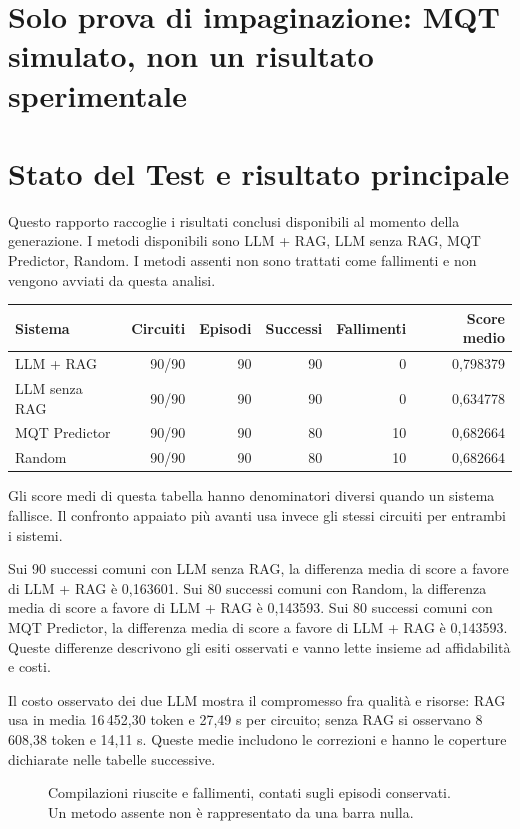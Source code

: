 \providecommand{\TestReportPath}{../}
\section*{Solo prova di impaginazione: MQT simulato, non un risultato sperimentale}
\section{Stato del Test e risultato principale}
Questo rapporto raccoglie i risultati conclusi disponibili al momento della generazione. I metodi disponibili sono LLM + RAG, LLM senza RAG, MQT Predictor, Random. I metodi assenti non sono trattati come fallimenti e non vengono avviati da questa analisi.

\begingroup\small
\setlength{\tabcolsep}{5pt}
\begin{center}
\begin{tabular}{lrrrrr}
\toprule
Sistema & Circuiti & Episodi & Successi & Fallimenti & Score medio \\
\midrule
LLM + RAG & 90/90 & 90 & 90 & 0 & 0,798379 \\
LLM senza RAG & 90/90 & 90 & 90 & 0 & 0,634778 \\
MQT Predictor & 90/90 & 90 & 80 & 10 & 0,682664 \\
Random & 90/90 & 90 & 80 & 10 & 0,682664 \\
\bottomrule
\end{tabular}
\end{center}
\endgroup
Gli score medi di questa tabella hanno denominatori diversi quando un sistema fallisce. Il confronto appaiato più avanti usa invece gli stessi circuiti per entrambi i sistemi.

Sui 90 successi comuni con LLM senza RAG, la differenza media di score a favore di LLM + RAG è 0,163601. Sui 80 successi comuni con Random, la differenza media di score a favore di LLM + RAG è 0,143593. Sui 80 successi comuni con MQT Predictor, la differenza media di score a favore di LLM + RAG è 0,143593. Queste differenze descrivono gli esiti osservati e vanno lette insieme ad affidabilità e costi.

Il costo osservato dei due LLM mostra il compromesso fra qualità e risorse: RAG usa in media 16\,452,30 token e 27,49 s per circuito; senza RAG si osservano 8\,608,38 token e 14,11 s. Queste medie includono le correzioni e hanno le coperture dichiarate nelle tabelle successive.

\begin{figure}[!htbp]\centering

\caption{Compilazioni riuscite e fallimenti, contati sugli episodi conservati. Un metodo assente non è rappresentato da una barra nulla.}
\end{figure}
\FloatBarrier
